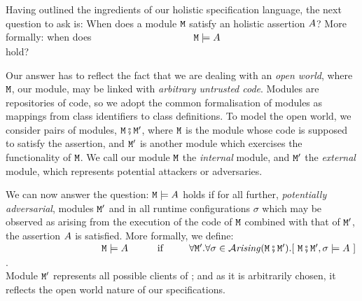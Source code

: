 

Having outlined the ingredients of our holistic specification
language, the next question to ask is: When does a module ${\mbox{\tt{\ensuremath{{\mbox{\tt{M}}}}}}}$ satisfy
an holistic assertion $A$?  More formally: when does
%
$~ \strut  \hspace{1.3in}\ {\mbox{\tt{\ensuremath{{\mbox{\tt{M}}}}}}} \models A$ \\
hold? 

  
Our answer has to reflect the fact that we are dealing with an 
\emph{open  world},  where  ${\mbox{\tt{\ensuremath{{\mbox{\tt{M}}}}}}}$, our module, may be
linked with \textit{arbitrary untrusted code}.
Modules are repositories of code, so we adopt the common formalisation 
of modules as  mappings from
class identifiers to class definitions.
%
%
%
To model the open world, we consider
 pairs of modules, 
${\mbox{\tt{\ensuremath{{\mbox{\tt{M}}}}}}} \fatsemi {{\mbox{\tt{\ensuremath{{\mbox{\tt{M}}}}}}}'}$,  where ${\mbox{\tt{\ensuremath{{\mbox{\tt{M}}}}}}}$ is the module 
whose code is supposed to satisfy the assertion,
and ${\mbox{\tt{\ensuremath{{\mbox{\tt{M}}}}}}}'$  is  another %
 module which exercises
the functionality of ${\mbox{\tt{\ensuremath{{\mbox{\tt{M}}}}}}}$. We call our module ${\mbox{\tt{\ensuremath{{\mbox{\tt{M}}}}}}}$ the {\em internal} module, and
 ${\mbox{\tt{\ensuremath{{\mbox{\tt{M}}}}}}}'$ the {\em external} module, which represents potential
 attackers or adversaries.
    
We can now answer the question: ${\mbox{\tt{\ensuremath{{\mbox{\tt{M}}}}}}} \models A$ 
 holds if for all further, {\em potentially adversarial}, modules ${\mbox{\tt{\ensuremath{{\mbox{\tt{M}}}}}}}'$ and in  all runtime configurations $\sigma$ which may be observed as arising from the  execution of the code of ${\mbox{\tt{\ensuremath{{\mbox{\tt{M}}}}}}}$ combined with that of ${\mbox{\tt{\ensuremath{{\mbox{\tt{M}}}}}}}'$, the assertion $A$ is satisfied. More formally, we define:\\
$~ \strut  \hspace{1.3in} \M \models \A \ \ \  \ \ \ \ \ \mbox{
if               } \ \ \  \ \ \  \  \forall \M'.\forall \sigma\in\Arising
{\M \mkpair  {\M'}}. [\ \M \mkpair  {\M'},\sigma \models \A\ ]$.  \\
Module ${\mbox{\tt{\ensuremath{{\mbox{\tt{M}}}}}}}'$ represents all possible clients of {\M}; and as it is arbitrarily chosen, it reflects the open world nature of our specifications.%

